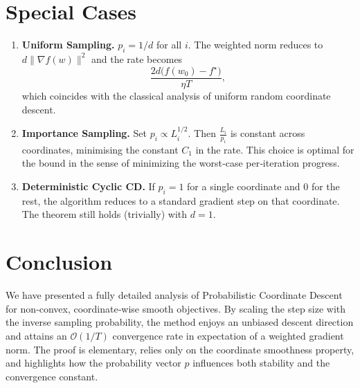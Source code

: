 \documentclass{article}
\begin{document}
\section*{Special Cases}
\begin{enumerate}[label=\alph*.]
\item \textbf{Uniform Sampling.} $p_i=1/d$ for all $i$.  The weighted norm reduces to $d\|\nabla f(w)\|^{2}$ and the rate becomes
\[
\frac{2d\bigl(f(w_0)-f^\star\bigr)}{\eta T},
\]
which coincides with the classical analysis of uniform random coordinate descent.

\item \textbf{Importance Sampling.} Set $p_i\propto L_i^{1/2}$.  Then $\frac{L_i}{p_i}$ is constant across coordinates, minimising the constant $C_1$ in the rate.  This choice is optimal for the bound in the sense of minimizing the worst‑case per‑iteration progress.

\item \textbf{Deterministic Cyclic CD.} If $p_i=1$ for a single coordinate and $0$ for the rest, the algorithm reduces to a standard gradient step on that coordinate.  The theorem still holds (trivially) with $d=1$.

\end{enumerate}

\section*{Conclusion}
We have presented a fully detailed analysis of Probabilistic Coordinate Descent for non‑convex, coordinate‑wise smooth objectives.  By scaling the step size with the inverse sampling probability, the method enjoys an unbiased descent direction and attains an $\mathcal{O}(1/T)$ convergence rate in expectation of a weighted gradient norm.  The proof is elementary, relies only on the coordinate smoothness property, and highlights how the probability vector $p$ influences both stability and the convergence constant.
\end{document}
